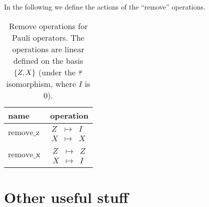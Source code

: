 \documentclass[a4paper,english]{scrartcl}
\begin{document}
\begin{definition}
In the following we define the actions of the ``remove'' operations.
\begin{table}[H]
\center
\caption[Remove operations for Pauli operators]{Remove operations for Pauli operators. The
operations are linear defined on the basis $\bc{Z, X}$ (under the $\overline{\tau}$ isomorphism,
where $I$ is $0$).}
\begin{tabular}{lr}
  \toprule
  name & operation\\
  \midrule
  $\mathrm{remove\_z}$ & $\begin{array}{ccc}
    Z&\mapsto&I\\X&\mapsto&X\end{array}$\\
  \midrule
  $\mathrm{remove\_x}$ & $\begin{array}{ccc}
    Z&\mapsto&Z\\X&\mapsto&I\end{array}$\\
  \bottomrule
\end{tabular}
\end{table}
\end{definition}

\appendix

\section{Other useful stuff}
\end{document}
